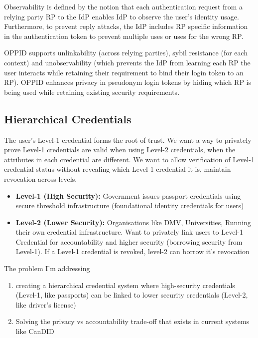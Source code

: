 Observability is defined by the notion that each authentication request from a relying party RP to the IdP enables IdP to observe the user's identity usage. Furthermore, to prevent reply attacks, the IdP includes RP specific information in the authentication token to prevent multiple uses or uses for the wrong RP.

OPPID \cite{kroschewski_oppid_2024} supports unlinkability (across relying parties), sybil resistance (for each context) and unobservability (which prevents the IdP from learning each RP the user interacts while retaining their requirement to bind their login token to an RP). OPPID enhances privacy in pseudonym login tokens by hiding which RP is being used while retaining existing security requirements.


\subsection{Hierarchical Credentials}




The user's Level-1 credential forms the root of trust.
We want a way to privately prove Level-1 credentials are valid when using Level-2 credentials, when the attributes in each credential are different. We want to allow verification of Level-1 credential status without revealing which Level-1 credential it is, maintain revocation across levels.
\begin{itemize}
    \item \textbf{Level-1 (High Security):} Government issues passport credentials using secure threshold infrastructure (foundational identity credentials for users)
    \item \textbf{Level-2 (Lower Security):} Organisations like DMV, Universities, Running their own credential infrastructure. Want to privately link users to Level-1 Credential for accountability and higher security (borrowing security from Level-1). If a Level-1 credential is revoked, level-2 can borrow it's revocation
\end{itemize}

The problem I'm addressing
\begin{enumerate}
    \item creating a hierarchical credential system where high-security credentials (Level-1, like passports) can be linked to lower security credentials (Level-2, like driver's license)
    \item Solving the privacy vs accountability trade-off that exists in current systems like CanDID
\end{enumerate}

